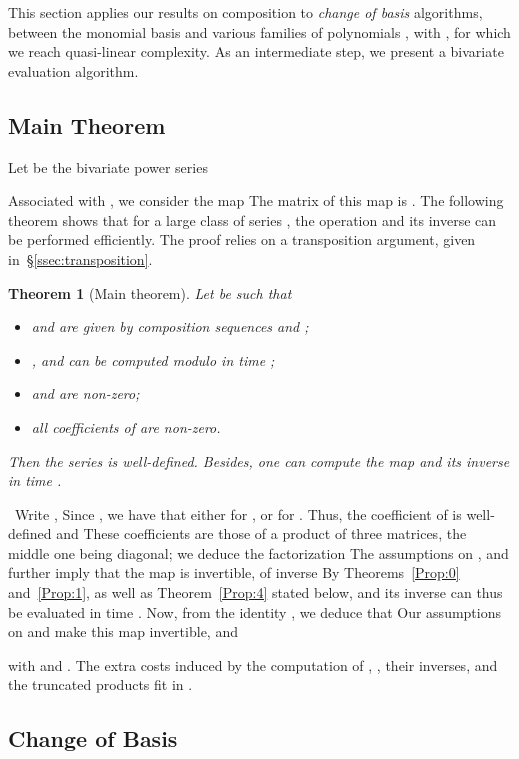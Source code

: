 \documentclass{sig-alternate}
\def\myproof{\noindent{\sc Proof.}~}
\def\foorp{\hfill}
\newtheorem{theorem}{Theorem}
\begin{document}
This section applies our results on composition to \emph{change of
basis} algorithms, between the monomial basis  and various
families of polynomials , with , for which we
reach quasi-linear complexity. As an intermediate step, we present a
bivariate evaluation algorithm.



\subsection{Main Theorem}

Let  be the bivariate power series

Associated with , we consider the map
 The matrix of this map is .
The following theorem shows that for a large class of series , the
operation  and its inverse can be performed
efficiently. The proof relies on a transposition
argument, given in~\S\ref{ssec:transposition}.\begin{theorem}[Main theorem]\label{Prop:3}
Let  be such that
\begin{itemize}
\item  and  are given by composition sequences  and ;
\item ,  and  can be computed modulo  in time ;
\item  and  are non-zero;
\item  all coefficients of 
  are non-zero.
\end{itemize}
Then the series
 is
well-defi\-ned. Besides, one can compute the map  and
its inverse in time .
\end{theorem}
\myproof Write ,
 Since
, we have that either
 for , or  for . 
Thus, the coefficient
 of  is well-defined and
 These
coefficients are those of a product of three matrices, the middle one
being diagonal; we deduce the factorization
 The assumptions on ,  and  further imply
that the map  is invertible, of inverse
 By
Theorems~\ref{Prop:0} and~\ref{Prop:1}, as well as
Theorem~\ref{Prop:4} stated below,  and its
inverse can thus be evaluated in time
. Now, from the identity , we deduce that
 Our assumptions on  and  make this
map invertible, and
 
with  and . The extra
costs induced by the computation of , , their inverses, and
the truncated products fit in .
\foorp



\subsection{Change of Basis}
\end{document}
